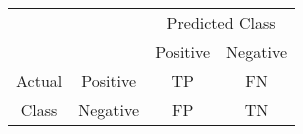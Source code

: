 \documentclass[class=jsarticle, crop=false, dvipdfmx, fleqn]{standalone}
\begin{document}
\begin{tabular}{|c|c|c|c|} \hline
\multicolumn{1}{|c}{} & & \multicolumn{2}{c|}{Predicted Class} \\ \cline{3-4}
\multicolumn{1}{|c}{} & & Positive & Negative \\ \hline
Actual & Positive & TP & FN \\ \cline{2-4}
Class & Negative & FP & TN \\ \hline
\end{tabular}
\end{document}

